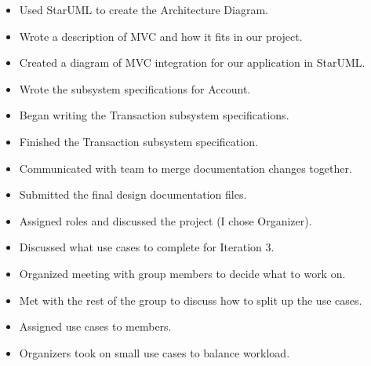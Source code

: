 \documentclass{article}
\begin{document}
  \begin{itemize}
    \item Used StarUML to create the Architecture Diagram.
  \end{itemize}

  \begin{itemize}
    \item Wrote a description of MVC and how it fits in our project.
  \end{itemize}
  \begin{itemize}
    \item Created a diagram of MVC integration for our application in StarUML.
  \end{itemize}
  \begin{itemize}
    \item Wrote the subsystem specifications for Account.
    \item Began writing the Transaction subsystem specifications.
  \end{itemize}
  \begin{itemize}
    \item Finished the Transaction subsystem specification.
    \item Communicated with team to merge documentation changes together.
    \item Submitted the final design documentation files.
  \end{itemize}

  \begin{itemize}
    \item Assigned roles and discussed the project (I chose Organizer).
    \item Discussed what use cases to complete for Iteration 3.
    \item Organized meeting with group members to decide what to work on.
  \end{itemize}
  
  \begin{itemize}
    \item Met with the rest of the group to discuss how to split up the use cases.
    \item Assigned use cases to members.
    \item Organizers took on small use cases to balance workload.
  \end{itemize}
\end{document}
